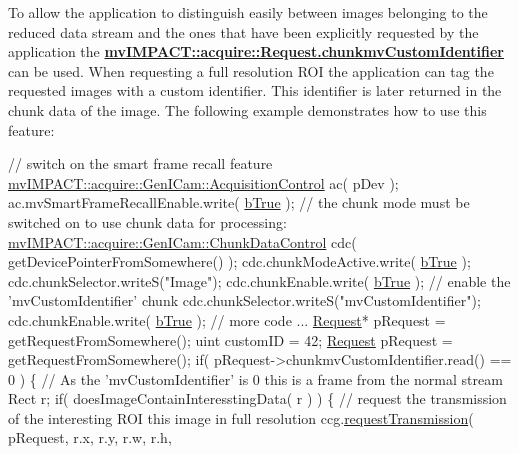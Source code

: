 To allow the application to distinguish easily between images belonging to the reduced data stream and the ones that have been explicitly requested by the application the {\bfseries \hyperlink{classmv_i_m_p_a_c_t_1_1acquire_1_1_request_a9d9f523d03a4ef82a5340f74ffc45934}{mv\+I\+M\+P\+A\+C\+T\+::acquire\+::\+Request.\+chunkmv\+Custom\+Identifier}} can be used. When requesting a full resolution R\+O\+I the application can tag the requested images with a custom identifier. This identifier is later returned in the chunk data of the image. The following example demonstrates how to use this feature\+:


\begin{DoxyCode}
\textcolor{comment}{// switch on the smart frame recall feature}
\hyperlink{classmv_i_m_p_a_c_t_1_1acquire_1_1_gen_i_cam_1_1_acquisition_control}{mvIMPACT::acquire::GenICam::AcquisitionControl} ac( pDev );
ac.mvSmartFrameRecallEnable.write( \hyperlink{group___common_interface_gga43c995be18b0dde1eeb4a16849c58968ac2ee8a1ca7dc97f0c2792a56f94c563b}{bTrue} );
\textcolor{comment}{// the chunk mode must be switched on to use chunk data for processing:}
\hyperlink{classmv_i_m_p_a_c_t_1_1acquire_1_1_gen_i_cam_1_1_chunk_data_control}{mvIMPACT::acquire::GenICam::ChunkDataControl} cdc( 
      getDevicePointerFromSomewhere() );
cdc.chunkModeActive.write( \hyperlink{group___common_interface_gga43c995be18b0dde1eeb4a16849c58968ac2ee8a1ca7dc97f0c2792a56f94c563b}{bTrue} );
cdc.chunkSelector.writeS(\textcolor{stringliteral}{"Image"});
cdc.chunkEnable.write( \hyperlink{group___common_interface_gga43c995be18b0dde1eeb4a16849c58968ac2ee8a1ca7dc97f0c2792a56f94c563b}{bTrue} );
\textcolor{comment}{// enable the 'mvCustomIdentifier' chunk}
cdc.chunkSelector.writeS(\textcolor{stringliteral}{"mvCustomIdentifier"});
cdc.chunkEnable.write( \hyperlink{group___common_interface_gga43c995be18b0dde1eeb4a16849c58968ac2ee8a1ca7dc97f0c2792a56f94c563b}{bTrue} );
\textcolor{comment}{// more code ...}
\hyperlink{struct___request}{Request}* pRequest = getRequestFromSomewhere();
uint customID = 42;
\hyperlink{struct___request}{Request} pRequest = getRequestFromSomewhere();
\textcolor{keywordflow}{if}( pRequest->chunkmvCustomIdentifier.read() == 0 )
\{
  \textcolor{comment}{// As the 'mvCustomIdentifier' is 0 this is a frame from the normal stream}
  Rect r;
  \textcolor{keywordflow}{if}( doesImageContainInteresstingData( r ) )
  \{
    \textcolor{comment}{// request the transmission of the interesting ROI this image in full resolution}
    ccg.\hyperlink{classmv_i_m_p_a_c_t_1_1acquire_1_1_gen_i_cam_1_1_custom_command_generator_a12316a89a5d4925deea45c067bb7d046}{requestTransmission}( pRequest, r.x, r.y, r.w, r.h, 

\end{DoxyCode}
